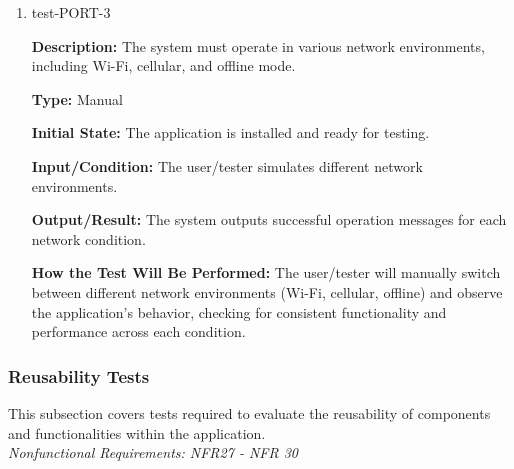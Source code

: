 \documentclass[12pt, titlepage]{article}
\begin{document}
\begin{enumerate}
\item{test-PORT-3\\}

\textbf{Description:} The system must operate in various network environments,
including Wi-Fi, cellular, and offline mode.

\textbf{Type:} Manual
					
\textbf{Initial State:} The application is installed and ready for testing.
					
\textbf{Input/Condition:} The user/tester simulates different network
environments.
					
\textbf{Output/Result:} The system outputs successful operation messages for
each network condition.
					
\textbf{How the Test Will Be Performed:} The user/tester will manually switch
between different network environments (Wi-Fi, cellular, offline) and observe
the application's behavior, checking for consistent functionality and
performance across each condition.

\end{enumerate}

\subsubsection{Reusability Tests}

This subsection covers tests required to evaluate the reusability of components and functionalities within the application. \\
\textit{Nonfunctional Requirements: NFR27 - NFR 30}
\end{document}
